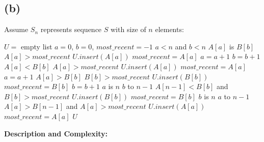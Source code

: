     \subsection{(b)}
    \begin{spacing}{1.1}
        Assume $S_n$ represents sequence $S$ with size of $n$ elements:
        \begin{codebox}
            \li $U =$ empty list
            \li $a = 0$, $b = 0$, $most\_recent = -1$
            \li \While $a < n$ and $b<n$
                \Do
                    \li \If $A[a]$ is $B[b]$
                    \Then
                        \li \If $A[a] > most\_recent$
                        \Then
                            \li $U.insert(A[a])$
                            \li $most\_recent = A[a]$
                        \End
                        \li $a = a + 1$
                        \li $b = b + 1$
                    \li \ElseIf $A[a] < B[b]$
                    \Then
                        \li \If $A[a] > most\_recent$
                        \Then
                            \li $U.insert(A[a])$
                            \li $most\_recent = A[a]$
                        \End
                        \li $a = a + 1$
                    \li \ElseIf $A[a] > B[b]$
                    \Then
                    \li \If $B[b] > most\_recent$
                        \Then
                            \li $U.insert(B[b])$
                            \li $most\_recent = B[b]$
                        \End
                        \li $b = b + 1$
                    \End 
                \End
            \li \If $a$ is $n$
            \Then
                \li \For $b$ to $n-1$
                \Then
                    \li \If $A[n-1]<B[b]$ and $B[b]>most\_recent$
                    \Then
                        \li $U.insert(B[b])$
                        \li $most\_recent = B[b]$
                    \End
                \End
            \li \ElseIf $b$ is $n$
            \Then
                \li \For $a$ to $n-1$
                \Then
                    \li \If $A[a]>B[n-1]$ and $A[a]>most\_recent$
                    \Then
                        \li $U.insert(A[a])$
                        \li $most\_recent = A[a]$
                    \End
                \End
            \End
            \li \Return $U$
        \end{codebox}
    \end{spacing}

    \textbf{Description and Complexity:}
    
